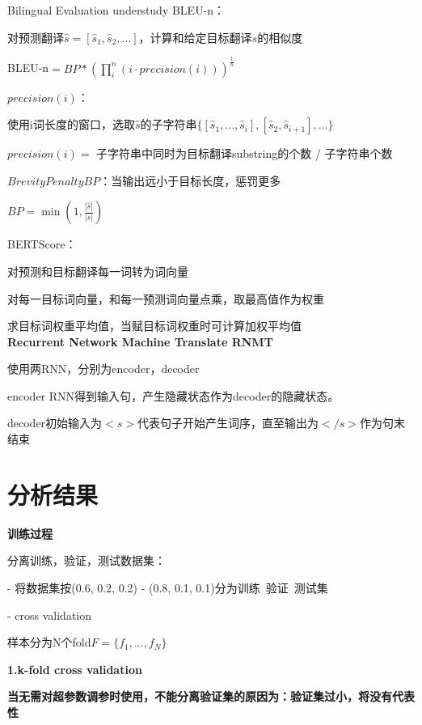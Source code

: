 \documentclass[UTF8]{ctexart}
\begin{document}
  Bilingual Evaluation understudy BLEU-n：

  \quad 对预测翻译$\hat{s} = [\hat{s}_1, \hat{s}_2, ...]$，计算和给定目标翻译$s$的相似度

  \quad BLEU-n$ = BP * (\prod_i^n (i \cdot precision(i)))^{\frac{1}{n}}$

  \quad \quad $precision(i)$：
  
  \quad \quad \quad 使用i词长度的窗口，选取$\hat{s}$的子字符串$\{ [\hat{s}_1, ..., \hat{s}_i], [\hat{s}_2, \hat{s}_{i+1}], ... \}$

  \quad \quad \quad $precision(i) = $ 子字符串中同时为目标翻译substring的个数 / 子字符串个数

  \quad \quad $Brevity Penalty BP$：当输出远小于目标长度，惩罚更多

  \quad \quad \quad $BP = \min(1, \frac{|\hat{s}|}{|s|})$

  BERTScore：

  \quad 对预测和目标翻译每一词转为词向量

  \quad 对每一目标词向量，和每一预测词向量点乘，取最高值作为权重

  \quad 求目标词权重平均值，当赋目标词权重时可计算加权平均值\\
\textbf{Recurrent Network Machine Translate RNMT}

  使用两RNN，分别为encoder，decoder

  encoder RNN得到输入句，产生隐藏状态作为decoder的隐藏状态。
  
  decoder初始输入为$<s>$代表句子开始产生词序，直至输出为$</s>$作为句末结束

  
\section{分析结果}
\noindent \textbf{训练过程}

  分离训练，验证，测试数据集：
  
  - 将数据集按(0.6, 0.2, 0.2) - (0.8, 0.1, 0.1)分为训练\ 验证\ 测试集

  - cross validation

  \quad 样本分为N个fold$F = \{f_1, ..., f_N\}$

  \quad \textbf{1.k-fold cross validation}

  \quad \quad \textbf{当无需对超参数调参时使用，不能分离验证集的原因为：验证集过小，将没有代表性}
\end{document}
